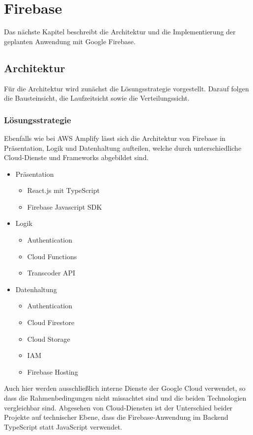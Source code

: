 \chapter{Firebase}
\label{kap5}

Das nächste Kapitel beschreibt die Architektur und die Implementierung der geplanten Anwendung mit Google Firebase.

\section{Architektur}

Für die Architektur wird zunächst die Lösungsstrategie vorgestellt. Darauf folgen die Bausteinsicht, die Laufzeitsicht sowie die Verteilungssicht.

\subsection{Lösungsstrategie}

Ebenfalls wie bei \ac{AWS} Amplify lässt sich die Architektur von Firebase in Präsentation, Logik und Datenhaltung aufteilen, welche durch unterschiedliche Cloud-Dienste und Frameworks abgebildet sind.
\begin{itemize}
  \item Präsentation
    \begin{itemize}
      \item React.js mit TypeScript
      \item Firebase Javascript SDK
    \end{itemize}
  \item Logik
    \begin{itemize}
      \item Authentication
      \item Cloud Functions
      \item Transcoder API
    \end{itemize}
  \item Datenhaltung
    \begin{itemize}
      \item Authentication
      \item Cloud Firestore
      \item Cloud Storage
      \item IAM
      \item Firebase Hosting
    \end{itemize}
\end{itemize}

Auch hier werden ausschließlich interne Dienste der Google Cloud verwendet, so dass die Rahmenbedingungen nicht missachtet sind und die beiden Technologien vergleichbar sind. Abgesehen von Cloud-Diensten ist der Unterschied beider Projekte auf technischer Ebene, dass die Firebase-Anwendung im Backend TypeScript statt JavaScript verwendet.

